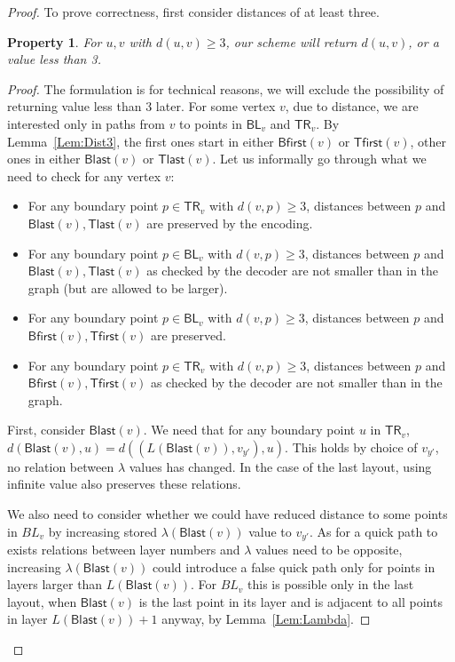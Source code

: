 \documentclass[a4paper,11pt]{article}
\newcommand{\lam}{\lambda}
\newcommand{\BL}{\mathsf{BL}}
\newcommand{\TR}{\mathsf{TR}}
\newcommand{\Blast}{\mathsf{Blast}}
\newcommand{\Bfirst}{\mathsf{Bfirst}}
\newcommand{\Tlast}{\mathsf{Tlast}}
\newcommand{\Tfirst}{\mathsf{Tfirst}}
\newtheorem{property}[theorem]{Property}
\begin{document}
\begin{proof}
To prove correctness, first consider distances of at least three.

\begin{property}
For $u,v$ with $d(u,v) \geq 3$, our scheme will return $d(u,v)$, or a value less than 3.
\label{Prop:Dec3}
\end{property}
\begin{proof}
The formulation is for technical reasons, we will exclude the possibility of returning value less than 3 later.
For some vertex $v$, due to distance, we are interested only in paths from $v$ to points in $\BL_v$ and $\TR_v$.
By Lemma~\ref{Lem:Dist3}, the first ones start in either $\Bfirst(v)$ or $\Tfirst(v)$,
other ones in either $\Blast(v)$ or $\Tlast(v)$.
Let us informally go through what we need to check for any vertex $v$:
\begin{itemize}
\item For any boundary point $p \in \TR_v$ with $d(v,p) \geq 3$, distances between $p$ and $\Blast(v),\Tlast(v)$ are preserved
by the encoding.
\item For any boundary point $p \in \BL_v$ with $d(v,p) \geq 3$, distances between $p$ and $\Blast(v),\Tlast(v)$
as checked by the decoder are not smaller than in the graph (but are allowed to be larger).
\item For any boundary point $p \in \BL_v$ with $d(v,p) \geq 3$, distances between $p$ and $\Bfirst(v),\Tfirst(v)$ are preserved.
\item For any boundary point $p \in \TR_v$ with $d(v,p) \geq 3$, distances between $p$ and $\Bfirst(v),\Tfirst(v)$
as checked by the decoder are not smaller than in the graph.
\end{itemize}

First, consider $\Blast(v)$.
We need that for any boundary point $u$ in $\TR_v$, $d(\Blast(v),u)=d((L(\Blast(v)),v_{y'}), u)$.
This holds by choice of $v_{y'}$, no relation between $\lam$ values has changed.
In the case of the last layout, using infinite value also preserves these relations.

We also need to consider whether we could have reduced distance to some points in $BL_v$
by increasing stored $\lam(\Blast(v))$ value to $v_{y'}$.
As for a quick path to exists relations between layer numbers and $\lam$ values need to be opposite,
increasing $\lam(\Blast(v))$ could introduce a false quick path only for points in layers larger than $L(\Blast(v))$.
For $BL_v$ this is possible only in the last layout, when $\Blast(v)$ is the last point in its layer
and is adjacent to all points in layer $L(\Blast(v))+1$ anyway, by Lemma~\ref{Lem:Lambda}.


\end{proof}
\end{proof}
\end{document}
